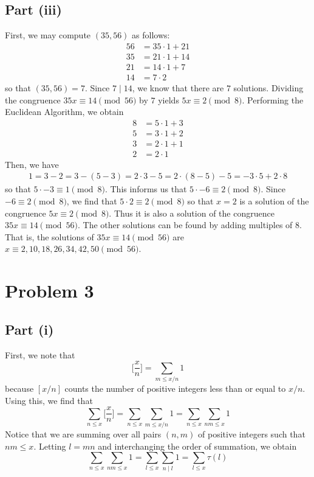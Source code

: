\documentclass[12pt]{article}
\begin{document}
\subsection*{Part (iii)}
First, we may compute $(35,56)$ as follows:
\begin{align*}
56 &= 35 \cdot 1 + 21\\
35 &= 21 \cdot 1 + 14\\
21 &= 14 \cdot 1 + 7\\
14 &= 7 \cdot 2
\end{align*} so that $(35,56) = 7$. Since $7 \mid 14$, we know that there are $7$ solutions. Dividing the congruence $35x \equiv 14 \pmod{56}$ by $7$ yields $5x \equiv 2 \pmod{8}$. Performing the Euclidean Algorithm, we obtain
\begin{align*}
8 &= 5 \cdot 1 + 3\\
5 &= 3 \cdot 1 + 2\\
3 &= 2\cdot 1 + 1\\
2 & = 2 \cdot 1
\end{align*} Then, we have
\begin{align*}
1 = 3 - 2 = 3 - (5 - 3) = 2\cdot 3 - 5 = 2\cdot (8-5) - 5 = - 3\cdot 5 + 2\cdot 8
\end{align*} so that $5 \cdot -3  \equiv 1 \pmod{8}$. This informs us that $5 \cdot -6 \equiv 2 \pmod{8}$. Since $-6 \equiv 2 \pmod{8}$, we find that $5 \cdot 2 \equiv 2 \pmod{8}$ so that $x = 2$ is a solution of the congruence $5x \equiv 2 \pmod{8}$. Thus it is also a solution of the congruence $35x \equiv 14 \pmod{56}$. The other solutions can be found by adding multiples of $8$. That is, the solutions of $35x \equiv 14 \pmod{56}$ are $x \equiv 2, 10, 18, 26, 34, 42, 50 \pmod{56}$.
\newpage
\section*{Problem 3}
\subsection*{Part (i)}
First, we note that 
\[
\bigg[ \frac{x}{n} \bigg] = \sum_{m \leq x/n} 1
\] because \([x/n]\) counts the number of positive integers less than or equal to \(x/n\). Using this, we find that
\[
\sum_{n \leq x} \bigg[ \frac{x}{n} \bigg] = \sum_{n \leq x} \sum_{m \leq x/n} 1 = \sum_{n \leq x} \sum_{nm \leq x} 1
\] Notice that we are summing over all pairs \((n,m)\) of positive integers such that \(nm \leq x\). Letting \(l = mn\) and interchanging the order of summation, we obtain
\[
\sum_{n \leq x} \sum_{nm \leq x} 1 = \sum_{l \leq x} \sum_{n \mid l} 1 = \sum_{l \leq x} \tau(l)
\]
\newpage
\end{document}
